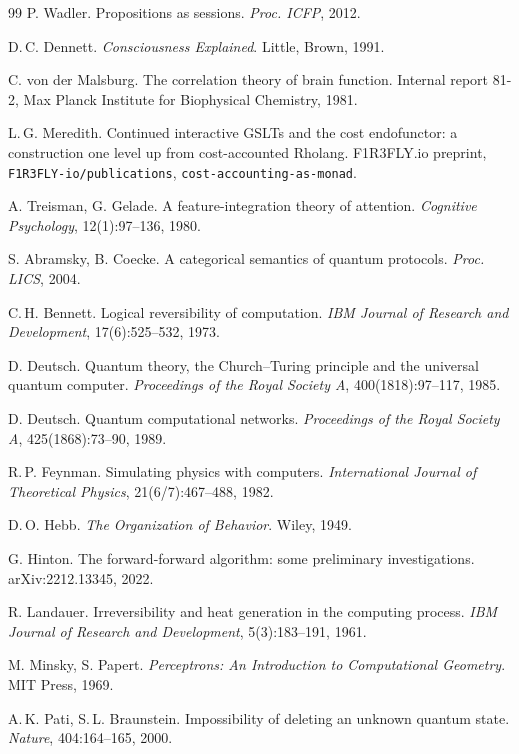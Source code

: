 \documentclass[11pt,a4paper]{article}
\begin{document}
\begin{thebibliography}{99}
 P. Wadler. Propositions as sessions. \emph{Proc. ICFP}, 2012.

 D.\,C. Dennett. \emph{Consciousness Explained}. Little,
Brown, 1991.

 C. von der Malsburg. The correlation theory of brain
function. Internal report 81-2, Max Planck Institute for Biophysical Chemistry,
1981.

 L.\,G. Meredith. Continued interactive GSLTs and the cost
endofunctor: a construction one level up from cost-accounted Rholang. F1R3FLY.io
preprint, \texttt{F1R3FLY-io/publications}, \texttt{cost-accounting-as-monad}.

 A. Treisman, G. Gelade. A feature-integration theory of
attention. \emph{Cognitive Psychology}, 12(1):97--136, 1980.

 S. Abramsky, B. Coecke. A categorical semantics of
quantum protocols. \emph{Proc. LICS}, 2004.

 C.\,H. Bennett. Logical reversibility of computation.
\emph{IBM Journal of Research and Development}, 17(6):525--532, 1973.

 D. Deutsch. Quantum theory, the Church--Turing principle and
the universal quantum computer. \emph{Proceedings of the Royal Society A},
400(1818):97--117, 1985.

 D. Deutsch. Quantum computational networks.
\emph{Proceedings of the Royal Society A}, 425(1868):73--90, 1989.

 R.\,P. Feynman. Simulating physics with computers.
\emph{International Journal of Theoretical Physics}, 21(6/7):467--488, 1982.

 D.\,O. Hebb. \emph{The Organization of Behavior}. Wiley, 1949.

 G. Hinton. The forward-forward algorithm: some preliminary
investigations. arXiv:2212.13345, 2022.

 R. Landauer. Irreversibility and heat generation in the
computing process. \emph{IBM Journal of Research and Development}, 5(3):183--191,
1961.

 M. Minsky, S. Papert. \emph{Perceptrons: An Introduction to
Computational Geometry}. MIT Press, 1969.

 A.\,K. Pati, S.\,L. Braunstein. Impossibility of deleting an
unknown quantum state. \emph{Nature}, 404:164--165, 2000.


\end{thebibliography}
\end{document}
